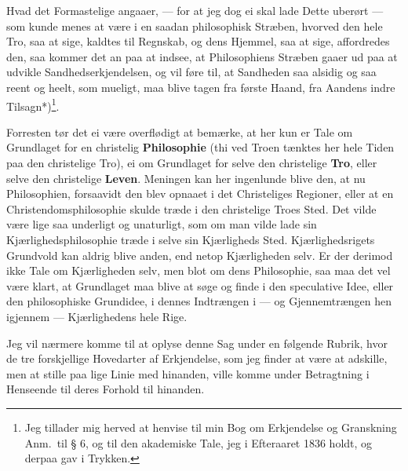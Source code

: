 \documentclass[12pt,a4paper]{book}
\newcommand{\apage}[1]{\marginnote{\footnotesize\textit{[#1]}}}
\begin{document}
Hvad det Formastelige angaaer, --- for at jeg dog ei skal lade Dette
uberørt --- som kunde menes at være i en saadan philosophisk Stræben,
hvorved den hele Tro, saa at sige, kaldtes til Regnskab, og dens
Hjemmel, saa at sige, affordredes den, saa kommer det an paa at indsee,
at Philosophiens Stræben gaaer ud paa at udvikle Sandhedserkjendelsen,
og vil føre til, at Sandheden saa alsidig og saa reent og heelt, som
mueligt, maa blive tagen fra første Haand, fra Aandens indre
Tilsagn*)\footnote{Jeg tillader mig herved at henvise til min Bog om
Erkjendelse og Granskning Anm.\ til § 6, og til den akademiske Tale,
jeg i Efteraaret 1836 holdt, og derpaa gav i Trykken.}.

Forresten tør det ei være overflødigt at bemærke, at her kun er Tale om
Grundlaget for en christelig \textbf{Philosophie} (thi ved Troen
tænktes her hele Tiden paa den christelige Tro), ei om Grundlaget for
selve den christelige \textbf{Tro}, eller selve den christelige
\textbf{Leven}. Meningen kan her ingenlunde blive den, at nu Philosophien,
forsaavidt den blev opnaaet i det Christeliges Regioner, eller at en
Christendomsphilosophie skulde træde i den christelige Troes Sted. Det
vilde være lige saa underligt og unaturligt, som om man vilde lade sin
Kjærlighedsphilosophie træde i selve sin Kjærligheds Sted.
Kjærlighedsrigets Grundvold kan aldrig blive anden, end netop
Kjærligheden selv. Er der derimod ikke Tale om Kjærligheden selv, men
blot om dens Philosophie, saa maa det vel være klart, at Grundlaget maa
blive at søge og finde i den speculative Idee, eller den philosophiske
Grundidee, i dennes Indtrængen i --- og Gjennemtrængen hen igjennem ---
Kjærlighedens hele Rige.

\apage{64} Jeg vil nærmere komme til at oplyse denne Sag under en følgende Rubrik,
hvor de tre forskjellige Hovedarter af Erkjendelse, som jeg finder at
være at adskille, men at stille paa lige Linie med hinanden, ville
komme under Betragtning i Henseende til deres Forhold til hinanden.
\end{document}
